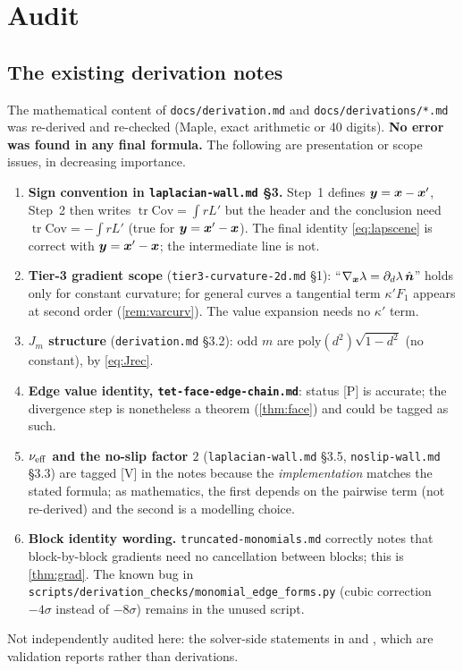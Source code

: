 \section{Audit}\label{app:audit}
\subsection{The existing derivation notes}

The mathematical content of \texttt{docs/derivation.md} and \texttt{docs/derivations/*.md} was re-derived and re-checked
(Maple, exact arithmetic or 40 digits). \textbf{No error was found in any final formula.} The following are
presentation or scope issues, in decreasing importance.
\begin{enumerate}
\item \textbf{Sign convention in \texttt{laplacian-wall.md} \S3.} Step~1 defines $\bm y=\bm x-\bm x'$, Step~2 then writes $\operatorname{tr}\mathrm{Cov}=\int rL'$ but the header and
the conclusion need $\operatorname{tr}\mathrm{Cov}=-\int rL'$ (true for $\bm y=\bm x'-\bm x$). The final identity \cref{eq:lapscene} is correct with $\bm y=\bm x'-\bm x$; the intermediate line is not.
\item \textbf{Tier-3 gradient scope} (\texttt{tier3-curvature-2d.md} \S1): ``$\nabla_{\bm x}\lambda=\partial_d\lambda\,\hat{\bm n}$'' holds only for constant curvature; for general curves
a tangential term $\kappa'F_1$ appears at second order (\cref{rem:varcurv}). The value expansion needs no $\kappa'$ term.
\item \textbf{$J_m$ structure} (\texttt{derivation.md} \S3.2): odd $m$ are $\mathrm{poly}(d^2)\sqrt{1-d^2}$ (no constant), by \cref{eq:Jrec}.
\item \textbf{Edge value identity, \texttt{tet-face-edge-chain.md}}: status \textsf{[P]} is accurate; the divergence step is nonetheless a theorem (\cref{thm:face}) and could be tagged as such.
\item \textbf{$\nu_{\rm eff}$ and the no-slip factor $2$} (\texttt{laplacian-wall.md} \S3.5, \texttt{noslip-wall.md} \S3.3) are tagged \textsf{[V]} in the notes because the \emph{implementation}
matches the stated formula; as mathematics, the first depends on the pairwise term (not re-derived) and the second is a modelling choice.
\item \textbf{Block identity wording.} \texttt{truncated-monomials.md} correctly notes that block-by-block gradients need no cancellation between blocks; this is \cref{thm:grad}.
The known bug in \texttt{scripts/derivation\_checks/monomial\_edge\_forms.py} (cubic correction $-4\sigma$ instead of $-8\sigma$) remains in the unused script.
\end{enumerate}
Not independently audited here: the solver-side statements in  and , which are validation reports rather than derivations.

